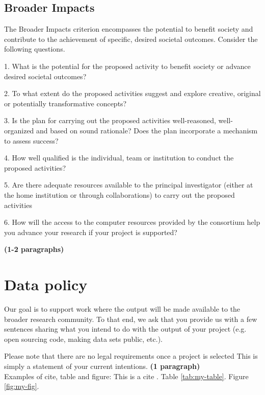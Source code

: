 \documentclass{lxaiproposal}
\begin{document}
\subsection{Broader Impacts}


The Broader Impacts criterion encompasses the potential to benefit society and contribute to the achievement of specific, desired societal outcomes. Consider the following questions.


1. What is the potential for the proposed activity to benefit society or advance desired societal outcomes?

2. To what extent do the proposed activities suggest and explore creative, original or potentially transformative concepts?

3. Is the plan for carrying out the proposed activities well-reasoned, well-organized and based on sound rationale? Does the plan incorporate a mechanism to assess success?

4. How well qualified is the individual, team or institution to conduct the proposed activities?

5. Are there adequate resources available to the principal investigator (either at the home institution or through collaborations) to carry out the proposed activities

6. How will the access to the computer resources provided by the consortium help you advance your research if your project is supported?

\textbf{(1-2 paragraphs)}


\section{Data policy}
\vspace*{-3mm}


Our goal is to support work where the output will be made available to the broader research community. To that end, we ask that you provide us with a few sentences sharing what you intend to do with the output of your project (e.g. open sourcing code, making data sets public, etc.).

Please note that there are no legal requirements once a project is selected This is simply a statement of your current intentions. 
\textbf{(1 paragraph)} \\

Examples of cite, table and figure: This is a cite \cite{daudon2018recurrence}. Table \ref{tab:my-table}. Figure \ref{fig:my-fig}.
\end{document}
